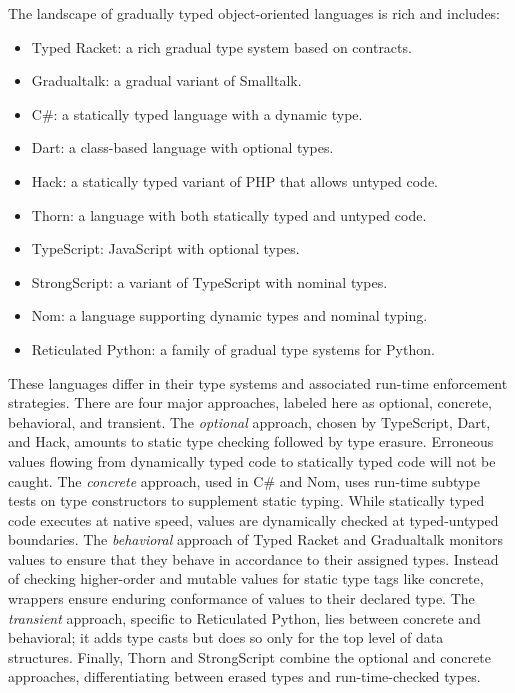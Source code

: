 \documentclass[a4paper,UKenglish]{lipics-v2018}
\newcounter{lem}
\begin{document}
The landscape of gradually typed object-oriented languages is rich and includes:\medskip
\begin{itemize}
\item Typed Racket: a rich gradual type system based on contracts.
\item Gradualtalk: a gradual variant of Smalltalk.
\item C\#: a statically typed language with a dynamic type.
\item Dart: a class-based language with optional types.
\item Hack: a statically typed variant of PHP that allows untyped code.
\item Thorn: a language with both statically typed and untyped code.
\item TypeScript: JavaScript with optional types.
\item StrongScript: a variant of TypeScript with nominal types.
\item Nom: a language supporting dynamic types and nominal typing.
\item Reticulated Python: a family of gradual type systems for Python.
\end{itemize}
\medskip These languages differ in their type systems and associated
run-time enforcement strategies. There are four major approaches, labeled here
as optional, concrete, behavioral, and transient. The \emph{optional}
approach, chosen by TypeScript, Dart, and Hack, amounts to static
type checking followed by type erasure. Erroneous values flowing from
dynamically typed code to statically typed code will not be caught. The
\emph{concrete} approach, used in C\# and Nom, uses run-time subtype tests
on type constructors to supplement static typing. While statically typed
code executes at native speed, values are dynamically checked at
typed-untyped boundaries. The \emph{behavioral} approach of Typed Racket and
Gradualtalk monitors values to ensure that they behave in accordance to
their assigned types. Instead of checking higher-order and mutable values
for static type tags like concrete, wrappers ensure enduring conformance of
values to their declared type. The \emph{transient} approach, specific to
Reticulated Python, lies between concrete and behavioral; it adds type casts
but does so only for the top level of data structures. Finally, Thorn and
StrongScript combine the optional and concrete approaches, differentiating
between erased types and run-time-checked types.
\end{document}
